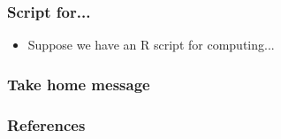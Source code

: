 \documentclass[aspectratio=169]{beamer}
\begin{document}
\begin{frame}
    \frametitle{Script for...}
    \begin{itemize}
        \item Suppose we have an R script for computing...
    \end{itemize}
\end{frame}




\begin{frame}
    \frametitle{Take home message}
\end{frame}

\begin{frame}[allowframebreaks]
	\frametitle{References}
	\printbibliography
\end{frame}
\end{document}
